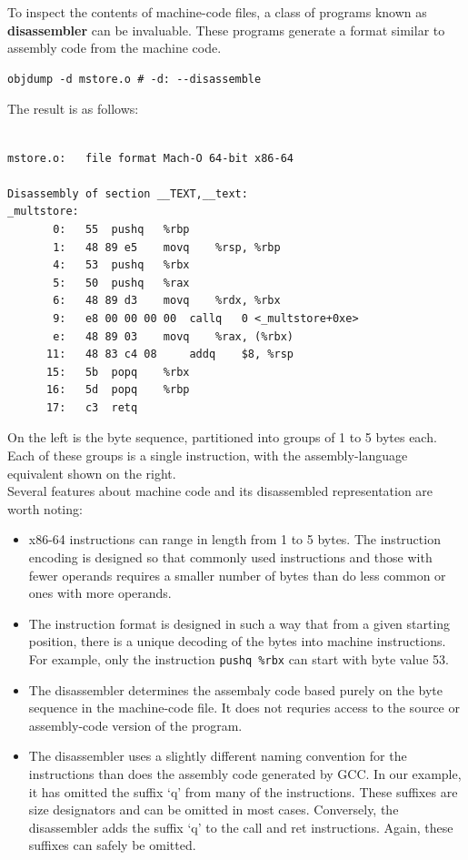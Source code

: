 \documentclass[11pt]{article}
\begin{document}
To inspect the contents of machine-code files, a class of programs known as \textbf{disassembler} can be invaluable. These programs generate a format similar to assembly code from the machine code.\\

\begin{verbatim}
objdump -d mstore.o # -d: --disassemble
\end{verbatim}

The result is as follows:\\
\begin{verbatim}

mstore.o:	file format Mach-O 64-bit x86-64

Disassembly of section __TEXT,__text:
_multstore:
       0:	55 	pushq	%rbp
       1:	48 89 e5 	movq	%rsp, %rbp
       4:	53 	pushq	%rbx
       5:	50 	pushq	%rax
       6:	48 89 d3 	movq	%rdx, %rbx
       9:	e8 00 00 00 00 	callq	0 <_multstore+0xe>
       e:	48 89 03 	movq	%rax, (%rbx)
      11:	48 83 c4 08 	addq	$8, %rsp
      15:	5b 	popq	%rbx
      16:	5d 	popq	%rbp
      17:	c3 	retq
\end{verbatim}

On the left is the byte sequence, partitioned into groups of 1 to 5 bytes each. Each of these groups is a single instruction, with the assembly-language equivalent shown on the right.\\

Several features about machine code and its disassembled representation are worth noting:\\
\begin{itemize}
\item x86-64 instructions can range in length from 1 to 5 bytes. The instruction encoding is designed so that commonly used instructions and those with fewer operands requires a smaller number of bytes than do less common or ones with more operands.\\
\item The instruction format is designed in such a way that from a given starting position, there is a unique decoding of the bytes into machine instructions. For example, only the instruction \texttt{pushq \%rbx} can start with byte value 53.\\
\item The disassembler determines the assembaly code based purely on the byte sequence in the machine-code file. It does not requries access to the source or assembly-code version of the program.\\
\item The disassembler uses a slightly different naming convention for the instructions than does the assembly code generated by GCC. In our example, it has omitted the suffix ‘q’ from many of the instructions. These suffixes are size designators and can be omitted in most cases. Conversely, the disassembler adds the suffix ‘q’ to the call and ret instructions. Again, these suffixes can safely be omitted.\\
\end{itemize}
\end{document}
